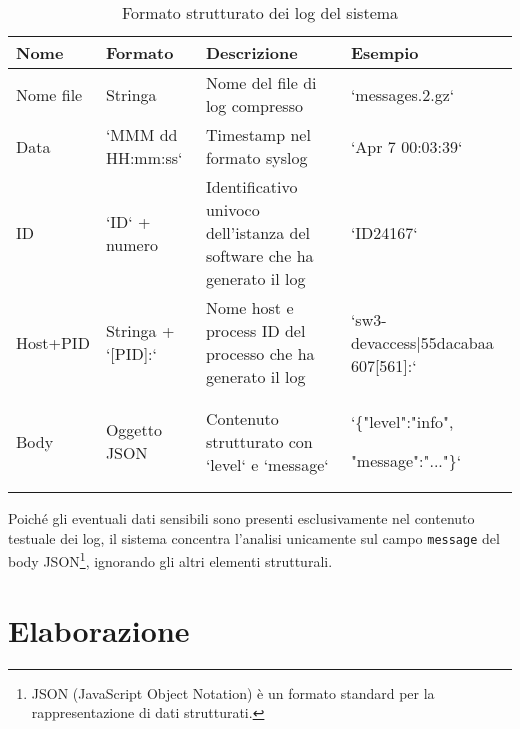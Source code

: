 \documentclass[12pt]{report}
\begin{document}
\begin{table}[h!]
    \centering
    \begin{tabular}{|p{}|p{}|p{}|p{}|}
        \hline
        \textbf{Nome} & \textbf{Formato}   & \textbf{Descrizione}                                                    & \textbf{Esempio}                    \\
        \hline
        Nome file     & Stringa            & Nome del file di log compresso                                          & `messages.2.gz`                     \\
        \hline
        Data          & `MMM dd HH:mm:ss`  & Timestamp nel formato syslog                                            & `Apr  7 00:03:39`                   \\
        \hline
        ID            & `ID` + numero      & Identificativo univoco dell'istanza del software che ha generato il log & `ID24167`                           \\
        \hline
        Host+PID      & Stringa + `[PID]:` & Nome host e process ID del processo che ha generato il log              & `sw3-devaccess|55dacabaa 607[561]:` \\
        \hline
        Body          & Oggetto JSON       & Contenuto strutturato con `level` e `message`                           & `\{"level":"info",

        "message":"..."\}`                                                                                                                                 \\
        \hline
    \end{tabular}
    \caption{Formato strutturato dei log del sistema}
    \label{tab:formato_log}
\end{table}



Poiché gli eventuali dati sensibili sono presenti esclusivamente nel contenuto testuale dei log, il sistema concentra l'analisi unicamente sul campo \texttt{message} del body JSON\footnote{JSON (JavaScript Object Notation) è un formato standard per la rappresentazione di dati strutturati.}, ignorando gli altri elementi strutturali.

\section{Elaborazione}
\label{sec:elaborazione_log}
\end{document}
